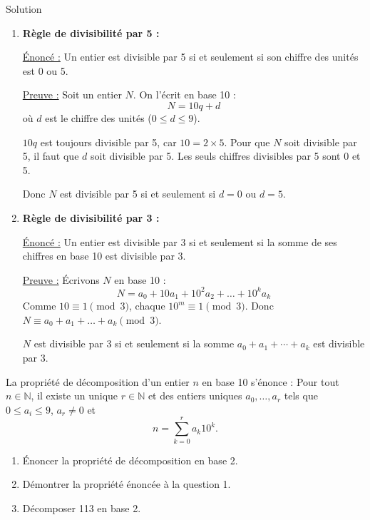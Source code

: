 \documentclass[a4paper,12pt]{article}
\begin{document}
\begin{solutionbox}{Solution}
\begin{enumerate}
    \item \textbf{Règle de divisibilité par 5 :}

    \underline{Énoncé :} Un entier est divisible par 5 si et seulement si son chiffre des unités est 0 ou 5.

    \underline{Preuve :}  
    Soit un entier $N$. On l’écrit en base 10 :  
    \[
    N = 10q + d
    \]
    où $d$ est le chiffre des unités ($0 \leq d \leq 9$).

    $10q$ est toujours divisible par 5, car $10 = 2 \times 5$. Pour que $N$ soit divisible par 5, il faut que $d$ soit divisible par 5. Les seuls chiffres divisibles par 5 sont 0 et 5.

    Donc $N$ est divisible par 5 si et seulement si $d=0$ ou $d=5$.

    \item \textbf{Règle de divisibilité par 3 :}

    \underline{Énoncé :} Un entier est divisible par 3 si et seulement si la somme de ses chiffres en base 10 est divisible par 3.

    \underline{Preuve :}  
    Écrivons $N$ en base 10 :
    \[
    N = a_0 + 10a_1 + 10^2 a_2 + \dots + 10^k a_k
    \]
    Comme $10 \equiv 1 \pmod{3}$, chaque $10^m \equiv 1 \pmod{3}$.  
    Donc $N \equiv a_0 + a_1 + \dots + a_k \pmod{3}$.

    $N$ est divisible par 3 si et seulement si la somme $a_0+a_1+\cdots+a_k$ est divisible par 3.
\end{enumerate}
\end{solutionbox}

\begin{exercice}[title=Exercice 27 $\quad \star \star \star \quad$ { [Raisonner, Communiquer, Chercher]}]{}{}
La propriété de décomposition d’un entier $n$ en base 10 s'énonce :
Pour tout $n \in \mathbb{N}$, il existe un unique $r \in \mathbb{N}$ et des entiers uniques $a_0,\dots,a_r$ tels que $0 \leq a_i \leq 9$, $a_r \neq 0$ et 
\[
n = \sum_{k=0}^r a_k 10^k.
\]
\begin{enumerate}
    \item Énoncer la propriété de décomposition en base 2.
    \item Démontrer la propriété énoncée à la question 1.
    \item Décomposer 113 en base 2.
\end{enumerate}
\end{exercice}
\end{document}
